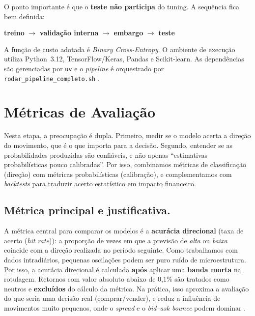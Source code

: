 O ponto importante é que o \textbf{teste não participa} do tuning.
A sequência fica bem definida:

\begin{center}
\textbf{treino} $\rightarrow$ \textbf{validação interna} $\rightarrow$ \textbf{embargo} $\rightarrow$ \textbf{teste}
\end{center}

A função de custo adotada é \emph{Binary Cross-Entropy}.
O ambiente de execução utiliza Python~3.12, TensorFlow/Keras, Pandas e Scikit-learn.
As dependências são gerenciadas por \texttt{uv}
e o \textit{pipeline} é orquestrado por \texttt{rodar\_pipeline\_completo.sh}
\cite{loshchilov2019}.

\section{Métricas de Avaliação}

Nesta etapa, a preocupação é dupla.
Primeiro, medir se o modelo acerta a direção do movimento, que é o que importa para a decisão.
Segundo, entender se as probabilidades produzidas são confiáveis, e não apenas “estimativas probabilísticas pouco calibradas”.
Por isso, combinamos métricas de classificação (direção) com métricas probabilísticas (calibração),
e complementamos com \textit{backtests} para traduzir acerto estatístico em impacto financeiro.

\subsection{Métrica principal e justificativa.}
A métrica central para comparar os modelos é a \textbf{acurácia direcional}
(taxa de acerto (\textit{hit rate})): a proporção de vezes em que a previsão de \emph{alta} ou \emph{baixa}
coincide com a direção realizada no período seguinte.
Como trabalhamos com dados intradiários, pequenas oscilações podem ser puro ruído de microestrutura.
Por isso, a acurácia direcional é calculada \textbf{após} aplicar uma \textbf{banda morta} na rotulagem.
Retornos com valor absoluto abaixo de 0,1\% são tratados como neutros e \textbf{excluídos}
do cálculo da métrica.
Na prática, isso aproxima a avaliação do que seria uma decisão real (comprar/vender),
e reduz a influência de movimentos muito pequenos, onde o \textit{spread} e o \emph{bid--ask bounce}
podem dominar \cite{hasbrouck2007empirical}.

